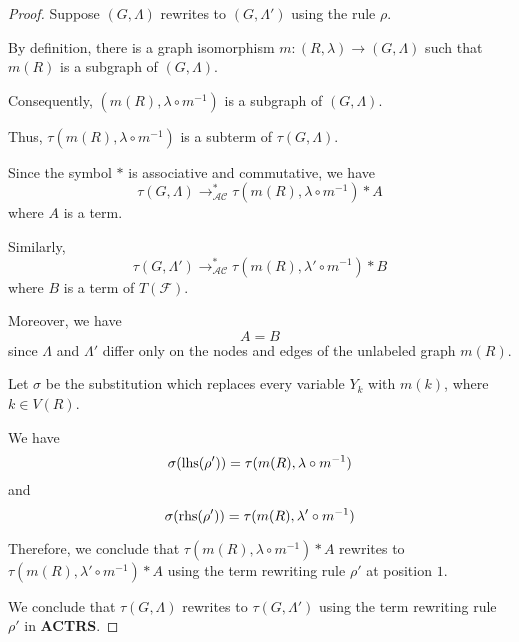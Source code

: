 \begin{proof}
    Suppose $(G, \Lambda)$ rewrites to $(G, \Lambda')$ using the rule $\rho$. 
    
    By definition, there is a graph isomorphism $m: (R,\lambda) \to (G,\Lambda)$ such that $m(R)$ is a subgraph of $(G,\Lambda)$.
    
    Consequently, $(m(R), \lambda \circ m^{-1})$ is a subgraph of $(G,\Lambda)$. 
    
    Thus, $\tau(m(R), \lambda \circ m^{-1})$ is a subterm of $\tau(G,\Lambda)$. 
    
    Since the symbol $*$ is associative and commutative, we have $$\tau(G,\Lambda) \to_\mathcal{AC}^* \tau(m(R),\lambda \circ m^{-1}) * A$$
    where $A$ is a term. 
    
    Similarly, 
    $$\tau(G,\Lambda')\to_\mathcal{AC}^* \tau(m(R), \lambda' \circ m^{-1}) * B$$
    where $B$ is a term of $T(\mathcal{F})$. 

    Moreover, we have $$A=B$$
    since $\Lambda$ and $\Lambda'$ differ only on the nodes and edges of the unlabeled graph $m(R)$.

    Let $\sigma$ be the substitution which replaces every variable $Y_k$ with $m(k)$, where $k \in V(R)$.
    
    We have 
    $$ \sigma(\operatorname{lhs}(\rho')) = \tau(m(R), \lambda \circ m^{-1})$$ 
    and  
    $$\sigma(\operatorname{rhs}(\rho')) = \tau(m(R), \lambda' \circ m^{-1})$$

    Therefore, we conclude that $\tau(m(R),\lambda \circ m^{-1}) * A$ rewrites to $\tau(m(R),\lambda' \circ m^{-1}) * A$ using the term rewriting rule $\rho'$ at position $1$.

    We conclude that $\tau(G,\Lambda)$ rewrites to $\tau(G,\Lambda')$ using the term rewriting rule $\rho'$ in \textbf{ACTRS}.
\end{proof}




